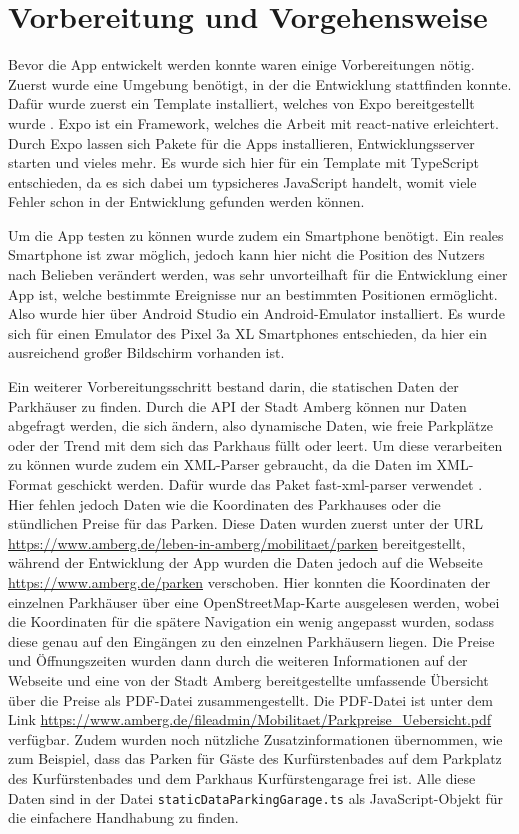 \chapter{Vorbereitung und Vorgehensweise}
\label{chap:2}

Bevor die App entwickelt werden konnte waren einige Vorbereitungen nötig. Zuerst wurde eine Umgebung benötigt, in der die Entwicklung stattfinden konnte. Dafür wurde zuerst ein Template installiert, welches von Expo bereitgestellt wurde \cite{expo}. Expo ist ein Framework, welches die Arbeit mit react-native erleichtert. Durch Expo lassen sich Pakete für die Apps installieren, Entwicklungsserver starten und vieles mehr. Es wurde sich hier für ein Template mit TypeScript entschieden, da es sich dabei um typsicheres JavaScript handelt, womit viele Fehler schon in der Entwicklung gefunden werden können.

Um die App testen zu können wurde zudem ein Smartphone benötigt. Ein reales Smartphone ist zwar möglich, jedoch kann hier nicht die Position des Nutzers nach Belieben verändert werden, was sehr unvorteilhaft für die Entwicklung einer App ist, welche bestimmte Ereignisse nur an bestimmten Positionen ermöglicht. Also wurde hier über Android Studio ein Android-Emulator installiert. Es wurde sich für einen Emulator des Pixel 3a XL Smartphones entschieden, da hier ein ausreichend großer Bildschirm vorhanden ist.

Ein weiterer Vorbereitungsschritt bestand darin, die statischen Daten der Parkhäuser zu finden. Durch die API der Stadt Amberg können nur Daten abgefragt werden, die sich ändern, also dynamische Daten, wie freie Parkplätze oder der Trend mit dem sich das Parkhaus füllt oder leert. Um diese verarbeiten zu können wurde zudem ein XML-Parser gebraucht, da die Daten im XML-Format geschickt werden. Dafür wurde das Paket fast-xml-parser verwendet \cite{xmlParser}. Hier fehlen jedoch Daten wie die Koordinaten des Parkhauses oder die stündlichen Preise für das Parken. Diese Daten wurden zuerst unter der URL \url{https://www.amberg.de/leben-in-amberg/mobilitaet/parken} bereitgestellt, während der Entwicklung der App wurden die Daten jedoch auf die Webseite \url{https://www.amberg.de/parken} verschoben. Hier konnten die Koordinaten der einzelnen Parkhäuser über eine OpenStreetMap-Karte ausgelesen werden, wobei die Koordinaten für die spätere Navigation ein wenig angepasst wurden, sodass diese genau auf den Eingängen zu den einzelnen Parkhäusern liegen. Die Preise und Öffnungszeiten wurden dann durch die weiteren Informationen auf der Webseite und eine von der Stadt Amberg bereitgestellte umfassende Übersicht über die Preise als PDF-Datei zusammengestellt. Die PDF-Datei ist unter dem Link \url{https://www.amberg.de/fileadmin/Mobilitaet/Parkpreise_Uebersicht.pdf} verfügbar. Zudem wurden noch nützliche Zusatzinformationen übernommen, wie zum Beispiel, dass das Parken für Gäste des Kurfürstenbades auf dem Parkplatz des Kurfürstenbades und dem Parkhaus Kurfürstengarage frei ist. Alle diese Daten sind in der Datei \verb|staticDataParkingGarage.ts| als JavaScript-Objekt für die einfachere Handhabung zu finden.


